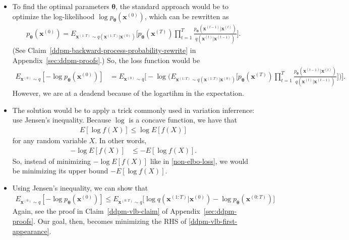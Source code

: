 \documentclass[10pt]{article}
\newcommand{\ve}[1]{\mathbf{#1}}
\newcommand{\ves}[1]{\boldsymbol{#1}}
\begin{document}
\begin{itemize}
\item To find the optimal parameters $\ves{\theta}$, the standard approach would be to optimize the log-likelihood $\log p_{\ves{\theta}}(\ve{x}^{(0)})$, which can be rewritten as
\begin{align*}
  p_{\ves{\theta}}(\ve{x}^{(0)}) = E_{\ve{x}^{(1:T)} \sim q(\ve{x}^{(1:T)}|\ve{x}^{(0)})} \bigg[ p_{\ves{\theta}}(\ve{x}^{(T)}) \prod_{t=1}^T \frac{ p_{\ves{\theta}}(\ve{x}^{(t-1)}|\ve{x}^{(t)})}{ q(\ve{x}^{(t)}|\ve{x}^{(t-1)})} \bigg].
\end{align*}
(See Claim~\ref{ddpm-backward-process-probability-rewrite} in Appendix~\ref{sec:ddpm-proofs}.) So, the loss function would be
\begin{align}
  E_{\ve{x}^{(0)} \sim q} [-\log p_{\ves{\theta}}(\ve{x}^{(0)})] 
  &= E_{\ve{x}^{(0)} \sim q} \bigg[ -\log \bigg( E_{\ve{x}^{(1:T)} \sim q(\ve{x}^{(1:T)}|\ve{x}^{(0)})} \bigg[ p_{\ves{\theta}}(\ve{x}^{(T)}) \prod_{t=1}^T \frac{ p_{\ves{\theta}}(\ve{x}^{(t-1)}|\ve{x}^{(t)})}{ q(\ve{x}^{(t)}|\ve{x}^{(t-1)})} \bigg] \bigg) \bigg]. \label{non-elbo-loss}
\end{align}
However, we are at a deadend because of the logartihm in the expectation.

\item The solution would be to apply a trick commonly used in variation inferrence: use Jensen's inequality. Because $\log$ is a concave function, we have that
\begin{align*}
  E [\log f(X)] \leq \log E[f(X)]
\end{align*}
for any random variable $X$. In other words,
\begin{align*}
  -\log E[f(X)] &\leq -E[\log f(X)].
\end{align*}
So, instead of minimizing $-\log E[f(X)]$ like in \eqref{non-elbo-loss}, we would be minimizing its upper bound $-E[ \log f(X)]$.

\item Using Jensen's inequality, we can show that
\begin{align}
  E_{\ve{x}^{(0)} \sim q} [-\log p_{\ves{\theta}}(\ve{x}^{(0)})]  \leq E_{\ve{x}^{(0:T)} \sim q}\Big[ \log q(\ve{x}^{(1:T)}|\ve{x}^{(0)}) - \log p_{\ves{\theta}}(\ve{x}^{(0:T)}) \Big] \label{ddpm-vlb-first-appearance}
\end{align}
Again, see the proof in Claim~\ref{ddpm-vlb-claim} of Appendix~\ref{sec:ddpm-proofs}. Our goal, then, becomes minimizing the RHS of \eqref{ddpm-vlb-first-appearance}. 


\end{itemize}
\end{document}
